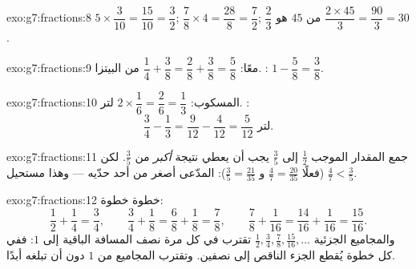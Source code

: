\begin{solution}{exo:g7:fractions:8}
$5 \times \dfrac{3}{10} = \dfrac{15}{10} = \dfrac32$; \quad
$\dfrac78 \times 4 = \dfrac{28}{8} = \dfrac72$; \quad
$\dfrac23$ من $45$ هو $\dfrac{2 \times 45}{3} = \dfrac{90}{3} = 30$.
\end{solution}

\begin{solution}{exo:g7:fractions:9}
معًا: $\dfrac14 + \dfrac38 = \dfrac28 + \dfrac38 = \dfrac58$ من
البيتزا. : $1 - \dfrac58 = \dfrac38$.
\end{solution}

\begin{solution}{exo:g7:fractions:10}
المسكوب: $2 \times \dfrac16 = \dfrac26 = \dfrac13$ لتر. :
\[
\frac34 - \frac13 = \frac{9}{12} - \frac{4}{12} = \frac{5}{12}
\text{ لتر}.
\]
\end{solution}

\begin{solution}{exo:g7:fractions:11}
جمع المقدار الموجب $\frac12$ إلى $\frac35$ يجب أن يعطي نتيجة
\emph{أكبر} من $\frac35$. لكن $\frac47 < \frac35$ (فعلًا
$\frac47 = \frac{20}{35}$ و $\frac35 = \frac{21}{35}$): 
المدّعى أصغر من أحد حدّيه --- وهذا مستحيل.
\end{solution}

\begin{solution}{exo:g7:fractions:12}
خطوة خطوة:
\[
\frac12 + \frac14 = \frac34, \qquad
\frac34 + \frac18 = \frac68 + \frac18 = \frac78, \qquad
\frac78 + \frac1{16} = \frac{14}{16} + \frac1{16} = \frac{15}{16}.
\]
والمجاميع الجزئية $\frac12, \frac34, \frac78, \frac{15}{16}, \dots$
تقترب في كل مرة نصف المسافة الباقية إلى $1$: ففي كل خطوة يُقطع الجزء
الناقص إلى نصفين. وتقترب المجاميع من $1$ دون أن تبلغه أبدًا.
\end{solution}

